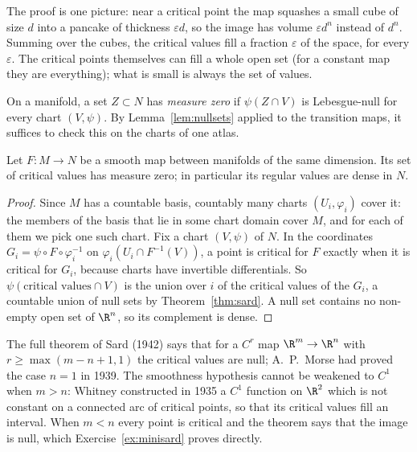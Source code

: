 \begin{beauty}
The proof is one picture: near a critical point the map squashes a small cube of size $d$ into a pancake of thickness $\varepsilon d$, so the image has
volume $\varepsilon d^n$ instead of $d^n$. Summing over the cubes, the critical values fill a fraction $\varepsilon$ of the space, for every $\varepsilon$.
The critical points themselves can fill a whole open set (for a constant map they are everything); what is small is always the set of values.
\end{beauty}

On a manifold, a set $Z\subset N$ has \emph{measure zero} if $\psi(Z\cap V)$ is Lebesgue-null for every chart $(V,\psi)$. By Lemma~\ref{lem:nullsets}
applied to the transition maps, it suffices to check this on the charts of one atlas.

\begin{corollary}\label{cor:sardmfd}
Let $F\colon M\to N$ be a smooth map between manifolds of the same dimension. Its set of critical values has measure zero; in particular its regular
values are dense in $N$.
\end{corollary}
\begin{proof}
Since $M$ has a countable basis, countably many charts $(U_i,\varphi_i)$ cover it: the members of the basis that lie in some chart domain
cover $M$, and for each of them we pick one such chart. Fix a chart $(V,\psi)$ of $N$. In the coordinates $G_i=\psi\circ F\circ\varphi_i^{-1}$ on $\varphi_i(U_i\cap F^{-1}(V))$, a point is
critical for $F$ exactly when it is critical for $G_i$, because charts have invertible differentials. So $\psi(\text{critical values}\cap V)$ is the union over
$i$ of the critical values of the $G_i$, a countable union of null sets by Theorem~\ref{thm:sard}. A null set contains no non-empty open set of
$\R^n$, so its complement is dense.
\end{proof}

\begin{remark}
The full theorem of Sard (1942) says that for a $C^r$ map $\R^m\to\R^n$ with $r\ge\max(m-n+1,1)$ the critical values are null; A.~P.~Morse had proved the
case $n=1$ in 1939. The smoothness hypothesis cannot be weakened to $C^1$ when $m>n$: Whitney constructed in 1935 a $C^1$ function on $\R^2$ which is not
constant on a connected arc of critical points, so that its critical values fill an interval. When $m<n$ every point is critical and the theorem says
that the image is null, which Exercise~\ref{ex:minisard} proves directly.
\end{remark}

